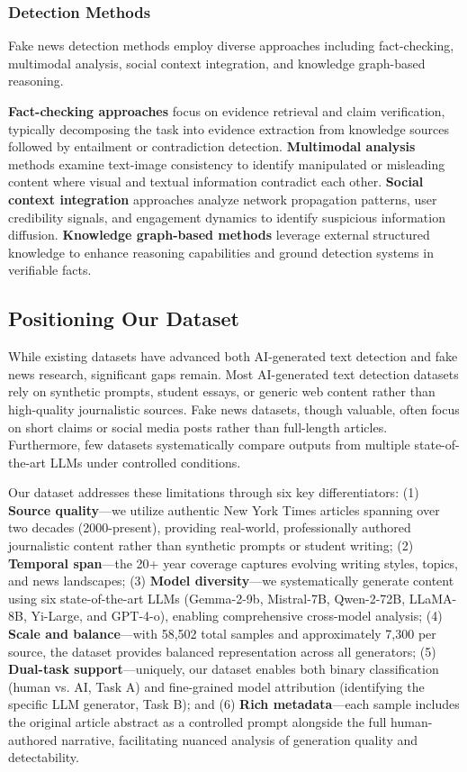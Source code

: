 \subsubsection{Detection Methods}

Fake news detection methods employ diverse approaches including fact-checking, multimodal analysis, social context integration, and knowledge graph-based reasoning.

\textbf{Fact-checking approaches} focus on evidence retrieval and claim verification, typically decomposing the task into evidence extraction from knowledge sources followed by entailment or contradiction detection. \textbf{Multimodal analysis} methods examine text-image consistency to identify manipulated or misleading content where visual and textual information contradict each other. \textbf{Social context integration} approaches analyze network propagation patterns, user credibility signals, and engagement dynamics to identify suspicious information diffusion. \textbf{Knowledge graph-based methods} leverage external structured knowledge to enhance reasoning capabilities and ground detection systems in verifiable facts.

\subsection{Positioning Our Dataset}

While existing datasets have advanced both AI-generated text detection and fake news research, significant gaps remain. Most AI-generated text detection datasets rely on synthetic prompts, student essays, or generic web content rather than high-quality journalistic sources. Fake news datasets, though valuable, often focus on short claims or social media posts rather than full-length articles. Furthermore, few datasets systematically compare outputs from multiple state-of-the-art LLMs under controlled conditions.

Our dataset addresses these limitations through six key differentiators: (1) \textbf{Source quality}---we utilize authentic New York Times articles spanning over two decades (2000-present), providing real-world, professionally authored journalistic content rather than synthetic prompts or student writing; (2) \textbf{Temporal span}---the 20+ year coverage captures evolving writing styles, topics, and news landscapes; (3) \textbf{Model diversity}---we systematically generate content using six state-of-the-art LLMs (Gemma-2-9b, Mistral-7B, Qwen-2-72B, LLaMA-8B, Yi-Large, and GPT-4-o), enabling comprehensive cross-model analysis; (4) \textbf{Scale and balance}---with 58,502 total samples and approximately 7,300 per source, the dataset provides balanced representation across all generators; (5) \textbf{Dual-task support}---uniquely, our dataset enables both binary classification (human vs. AI, Task A) and fine-grained model attribution (identifying the specific LLM generator, Task B); and (6) \textbf{Rich metadata}---each sample includes the original article abstract as a controlled prompt alongside the full human-authored narrative, facilitating nuanced analysis of generation quality and detectability.

